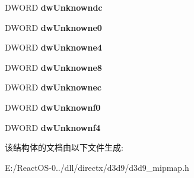 \begin{DoxyCompactItemize}
D\+W\+O\+RD {\bfseries dw\+Unknowndc}
\item 
\mbox{\label{struct___d3_d9_mip_map_a4b7471aef486011a8e95ee9be170865d}} 
D\+W\+O\+RD {\bfseries dw\+Unknowne0}
\item 
\mbox{\label{struct___d3_d9_mip_map_a84dd318c9d3992457669ef4ce3153263}} 
D\+W\+O\+RD {\bfseries dw\+Unknowne4}
\item 
\mbox{\label{struct___d3_d9_mip_map_a89d5d7a84fb62f3e552b833ade49465a}} 
D\+W\+O\+RD {\bfseries dw\+Unknowne8}
\item 
\mbox{\label{struct___d3_d9_mip_map_a9523e327be921cca0ec63973a9f9e0d3}} 
D\+W\+O\+RD {\bfseries dw\+Unknownec}
\item 
\mbox{\label{struct___d3_d9_mip_map_a92fb896dbae4162501c6a582c69cd733}} 
D\+W\+O\+RD {\bfseries dw\+Unknownf0}
\item 
\mbox{\label{struct___d3_d9_mip_map_a336220dc274cd283d854c5eba8b6bf0e}} 
D\+W\+O\+RD {\bfseries dw\+Unknownf4}
\end{DoxyCompactItemize}


该结构体的文档由以下文件生成\+:\begin{DoxyCompactItemize}
\item 
E\+:/\+React\+O\+S-\/0../dll/directx/d3d9/d3d9\+\_\+mipmap.\+h\end{DoxyCompactItemize}
